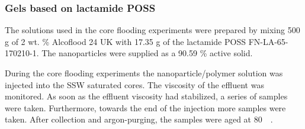 \subsubsection{Gels based on lactamide POSS}

 The solutions used in the core flooding experiments were prepared by mixing 500 g of 2 wt. \% Alcoflood 24 UK with 17.35 g of the lactamide POSS FN-LA-65-170210-1. The nanoparticles were supplied as a 90.59 \% active solid.

During the core flooding experiments the nanoparticle/polymer solution was injected into the SSW saturated cores. The viscosity of the effluent was monitored. As soon as the effluent viscosity had stabilized, a series of samples were taken. Furthermore, towards the end of the injection more samples were taken. After collection and argon-purging, the samples were aged at 80~\celsius~. 

